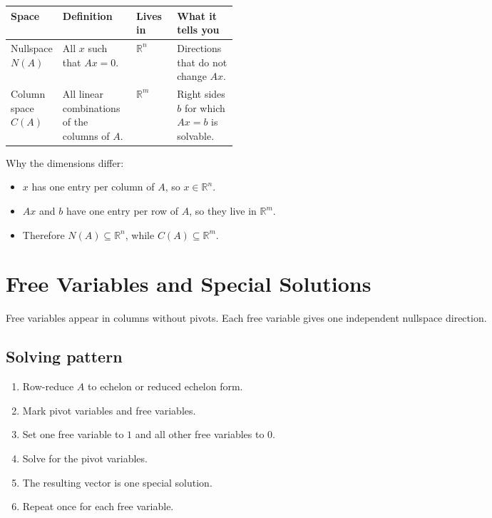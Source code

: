 \documentclass[10pt]{article}
\begin{document}
\begin{center}
\small
\begin{tabularx}{\linewidth}{@{}L{0.19\linewidth}Y L{0.18\linewidth}Y@{}}
\toprule
Space & Definition & Lives in & What it tells you \\
\midrule
Nullspace \(N(A)\) & All \(x\) such that \(Ax=0\). & \(\mathbb{R}^n\) & Directions that do not change \(Ax\). \\
Column space \(C(A)\) & All linear combinations of the columns of \(A\). & \(\mathbb{R}^m\) & Right sides \(b\) for which \(Ax=b\) is solvable. \\
\bottomrule
\end{tabularx}
\end{center}

Why the dimensions differ:
\begin{itemize}
  \item \(x\) has one entry per column of \(A\), so \(x\in\mathbb{R}^n\).
  \item \(Ax\) and \(b\) have one entry per row of \(A\), so they live in \(\mathbb{R}^m\).
  \item Therefore \(N(A)\subseteq\mathbb{R}^n\), while \(C(A)\subseteq\mathbb{R}^m\).
\end{itemize}


\section{Free Variables and Special Solutions}

Free variables appear in columns without pivots. Each free variable gives one independent nullspace direction.

\subsection{Solving pattern}

\begin{enumerate}
  \item Row-reduce \(A\) to echelon or reduced echelon form.
  \item Mark pivot variables and free variables.
  \item Set one free variable to \(1\) and all other free variables to \(0\).
  \item Solve for the pivot variables.
  \item The resulting vector is one special solution.
  \item Repeat once for each free variable.
\end{enumerate}
\end{document}
